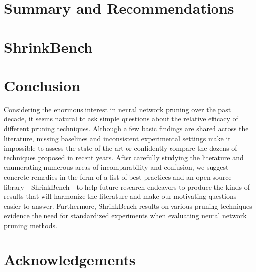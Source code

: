 \documentclass{article}  %
\begin{document}


\section{Summary and Recommendations}



\section{ShrinkBench} \label{sec:bench}

% 



\vspace{-1mm}
\section{Conclusion}

Considering the enormous interest in neural network pruning over the past decade, it seems natural to ask simple questions about the relative efficacy of different pruning techniques.
Although a few basic findings are shared across the literature, missing baselines and inconsistent experimental settings make it impossible to assess the state of the art or confidently compare the dozens of techniques proposed in recent years.
After carefully studying the literature and enumerating numerous areas of incomparability and confusion, we suggest concrete remedies in the form of a list of best practices and an open-source library---ShrinkBench---to help future research endeavors to produce the kinds of results that will harmonize the literature and make our motivating questions easier to answer. Furthermore, ShrinkBench results on various pruning techniques evidence the need for standardized experiments when evaluating neural network pruning methods.

\section*{Acknowledgements}
\end{document}
